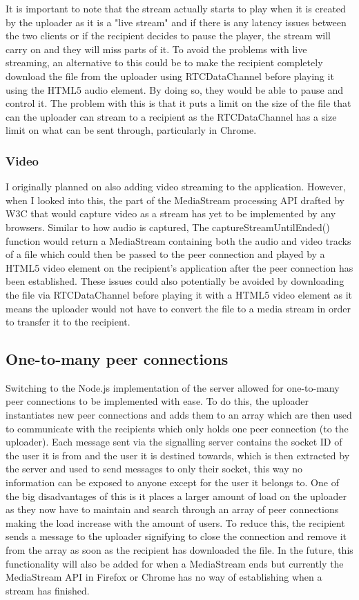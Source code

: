 \documentclass[]{report}
\begin{document}
				It is important to note that the stream actually starts to play when it is created by the uploader as it is a "live stream" and if there is any latency issues between the two clients or if the recipient decides to pause the player, the stream will carry on and they will miss parts of it. To avoid the problems with live streaming, an alternative to this could be to make the recipient completely download the file from the uploader using RTCDataChannel before playing it using the HTML5 audio element. By doing so, they would be able to pause and control it. The problem with this is that it puts a limit on the size of the file that can the uploader can stream to a recipient as the RTCDataChannel has a size limit on what can be sent through, particularly in Chrome.

				\subsubsection{Video}
				I originally planned on also adding video streaming to the application. However, when I looked into this, the part of the MediaStream processing API drafted by W3C  that would capture video as a stream has yet to be implemented by any browsers. Similar to how audio is captured, The captureStreamUntilEnded() function would return a MediaStream containing both the audio and video tracks of a file which could then be passed to the peer connection and played by a HTML5 video element on the recipient's application after the peer connection has been established. These issues could also potentially be avoided by downloading the file via RTCDataChannel before playing it with a HTML5 video element as it means the uploader would not have to convert the file to a media stream in order to transfer it to the recipient.
			
			\subsection{One-to-many peer connections}
			Switching to the Node.js implementation of the server allowed for one-to-many peer connections to be implemented with ease. To do this, the uploader instantiates new peer connections and adds them to an array which are then used to communicate with the recipients which only holds one peer connection (to the uploader). Each message sent via the signalling server contains the socket ID of the user it is from and the user it is destined towards, which is then extracted by the server and used to send messages to only their socket, this way no information can be exposed to anyone except for the user it belongs to. One of the big disadvantages of this is it places a larger amount of load on the uploader as they now have to maintain and search through an array of peer connections making the load increase with the amount of users. To reduce this, the recipient sends a message to the uploader signifying to close the connection and remove it from the array as soon as the recipient has downloaded the file. In the future, this functionality will also be added for when a MediaStream ends but currently the MediaStream API in Firefox or Chrome has no way of establishing when a stream has finished.
			 
\end{document}
